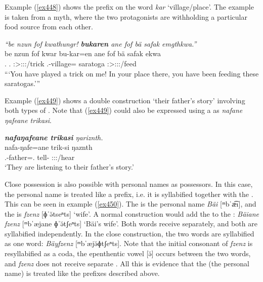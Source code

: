Example (\ref{ex448}) shows the  prefix on the word \emph{kar} `village/place'. The example is taken from a myth, where the two protagonists are withholding a particular food source from each other.

\begin{exe}
	\ex \emph{``be nzun fof kwathungr! \textbf{bukaren} ane fof bä safak emgthkwa.''}\\
	\gll be nzun fof kwar bu-kar=en ane fof bä safak ekwa\\
	\Ssg.{\Erg} \Fsg.{\Dat} {\Emph} \Stsg:\Sbj>\Fsg:\Io:\Rpst:\Ipfv/trick \Ssg.\Poss-village={\Loc} {\Dem} {\Emph} \Med{} saratoga \Stsg:\Sbj>\Stpl:\Obj:\Pst:\Ipfv/feed\\
	\trans ```You have played a trick on me! In your place there, you have been feeding these saratogas.'''
	\label{ex448}
\end{exe}

Example (\ref{ex449}) shows a double  construction `their father's story' involving both types of . Note that (\ref{ex449}) could also be expressed using a   as \emph{nafane ŋafeane trikasi}.
	
\begin{exe}
	\ex \emph{\textbf{nafaŋafeane trikasi} ŋariznth.}\\
	\gll nafa-ŋafe=ane trik-si ŋaznth\\
	\Third.\Poss-father=\Poss.{\Sg} tell-{\Nmlz} \Stdu:\Sbj:\Nonpast:\Ipfv/hear\\
	\trans `They are listening to their father's story.'
	\label{ex449}
\end{exe}

Close possession is also possible with personal names as possessors. In this case, the personal name is treated like a prefix, i.e. it is syllabified together with the . This can be seen in example (\ref{ex450}). The  is the personal name \emph{Bäi} [{ᵐ}bˈæ͡ı], and the  is \emph{fzenz} [ɸˈə̆tse{ⁿ}ts] `wife'. A normal  construction would add the   to the : \emph{Bäiane fzenz} [{ᵐ}bˈæjane ɸˈə̆tʃe{ⁿ}ts] `Bäi's wife'. Both words receive  separately, and both are syllabified independently. In the close  construction, the two words are syllabified as one word: \emph{Bäyfzenz} [{ᵐ}bˈæjə̆ɸtʃe{ⁿ}ts]. Note that the initial consonant of \emph{fzenz} is resyllabified as a coda, the epenthentic vowel [ə̆] occurs between the two words, and \emph{fzenz} does not receive separate . All this is evidence that the  (the personal name) is treated like the prefixes described above.

